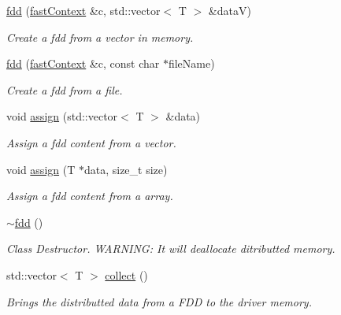 \begin{DoxyCompactItemize}
\hyperlink{classfaster_1_1fdd_a76eee3a3adcb360d9b63bb50c1214de3}{fdd} (\hyperlink{classfaster_1_1fastContext}{fast\+Context} \&c, std\+::vector$<$ T $>$ \&dataV)
\begin{DoxyCompactList}\small\item\em Create a fdd from a vector in memory. \end{DoxyCompactList}\item 
\hypertarget{classfaster_1_1fdd_adc3ebc12c9d508b2957f5e6759544bee}{}\label{classfaster_1_1fdd_adc3ebc12c9d508b2957f5e6759544bee} 
\hyperlink{classfaster_1_1fdd_adc3ebc12c9d508b2957f5e6759544bee}{fdd} (\hyperlink{classfaster_1_1fastContext}{fast\+Context} \&c, const char $\ast$file\+Name)
\begin{DoxyCompactList}\small\item\em Create a fdd from a file. \end{DoxyCompactList}\item 
\hypertarget{classfaster_1_1fdd_ae1a17043db351aea043ab68a92976386}{}\label{classfaster_1_1fdd_ae1a17043db351aea043ab68a92976386} 
void \hyperlink{classfaster_1_1fdd_ae1a17043db351aea043ab68a92976386}{assign} (std\+::vector$<$ T $>$ \&data)
\begin{DoxyCompactList}\small\item\em Assign a fdd content from a vector. \end{DoxyCompactList}\item 
\hypertarget{classfaster_1_1fdd_a8ab9e1a569f83b5bc9cb70777a14297e}{}\label{classfaster_1_1fdd_a8ab9e1a569f83b5bc9cb70777a14297e} 
void \hyperlink{classfaster_1_1fdd_a8ab9e1a569f83b5bc9cb70777a14297e}{assign} (T $\ast$data, size\+\_\+t size)
\begin{DoxyCompactList}\small\item\em Assign a fdd content from a array. \end{DoxyCompactList}\item 
\hypertarget{classfaster_1_1fdd_aea20888cf4c003e7ad518e1a88e94200}{}\label{classfaster_1_1fdd_aea20888cf4c003e7ad518e1a88e94200} 
\hyperlink{classfaster_1_1fdd_aea20888cf4c003e7ad518e1a88e94200}{$\sim$fdd} ()
\begin{DoxyCompactList}\small\item\em Class Destructor. W\+A\+R\+N\+I\+NG\+: It will deallocate ditributted memory. \end{DoxyCompactList}\item 
std\+::vector$<$ T $>$ \hyperlink{classfaster_1_1fdd_a089aa4c91205948dacbc6e6bd6e5bcde}{collect} ()
\begin{DoxyCompactList}\small\item\em Brings the distributted data from a F\+DD to the driver memory. \end{DoxyCompactList}\item 

\end{DoxyCompactItemize}
